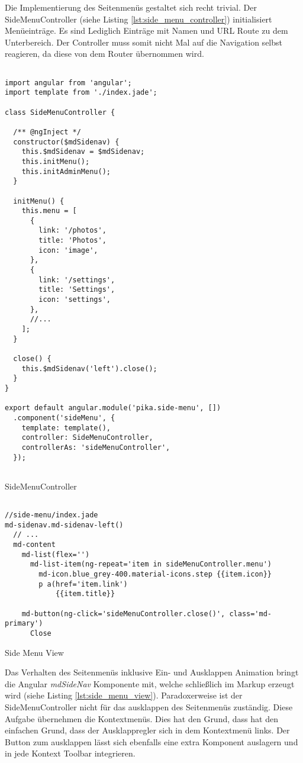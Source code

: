 Die Implementierung des Seitenmenüs gestaltet sich recht trivial. Der SideMenuController (siehe Listing \ref{lst:side_menu_controller}) initialisiert Menüeinträge. Es sind Lediglich Einträge mit Namen und URL Route zu dem Unterbereich. Der Controller muss somit nicht Mal auf die Navigation selbst reagieren, da diese von dem Router übernommen wird.


\begin{listing}[H]
\begin{verbatim}

import angular from 'angular';
import template from './index.jade';

class SideMenuController {

  /** @ngInject */
  constructor($mdSidenav) {
    this.$mdSidenav = $mdSidenav;
    this.initMenu();
    this.initAdminMenu();
  }

  initMenu() {
    this.menu = [
      {
        link: '/photos',
        title: 'Photos',
        icon: 'image',
      },
      {
        link: '/settings',
        title: 'Settings',
        icon: 'settings',
      },
      //...
    ];
  }

  close() {
    this.$mdSidenav('left').close();
  }
}

export default angular.module('pika.side-menu', [])
  .component('sideMenu', {
    template: template(),
    controller: SideMenuController,
    controllerAs: 'sideMenuController',
  });


\end{verbatim}
\caption{SideMenuController}
\label{lst:side_menu_controller}
\end{listing} 


\begin{listing}[H]
\begin{verbatim}

//side-menu/index.jade
md-sidenav.md-sidenav-left()
  // ...
  md-content
    md-list(flex='')
      md-list-item(ng-repeat='item in sideMenuController.menu')
        md-icon.blue_grey-400.material-icons.step {{item.icon}}
        p a(href='item.link')
            {{item.title}}
     
    md-button(ng-click='sideMenuController.close()', class='md-primary') 
      Close

\end{verbatim}
\caption{Side Menu View}
\label{lst:side_menu_view}
\end{listing} 

Das Verhalten des Seitenmenüs inklusive Ein- und Ausklappen Animation bringt die Angular \textit{mdSideNav} Komponente mit, welche schließlich im Markup erzeugt wird (siehe Listing \ref{lst:side_menu_view}). Paradoxerweise ist der SideMenuController nicht für das ausklappen des Seitenmenüs zuständig. Diese Aufgabe übernehmen die Kontextmenüs. Dies hat den Grund, dass hat den einfachen Grund, dass der Ausklappregler sich in dem Kontextmenü links. Der Button zum ausklappen lässt sich ebenfalls eine extra Komponent auslagern und in jede Kontext Toolbar integrieren. 

